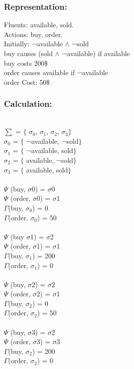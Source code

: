 \documentclass[11pt]{article}
\begin{document}
	\subsubsection{Representation:}\label{par:p202}
	\indent 
	Fluents: available, sold.\\
	Actions: buy, order.\\
	Initially: ¬available $\wedge$  ¬sold\\
	buy causes (sold $\land$ ¬available) if available\\
	buy costs 200$\$$ \\
	order causes available if ¬available\\
	order Cost: 50$\$$ \\
	
	\subsubsection{Calculation:}\label{par:p302}
	\indent \\
	$ \sum $ = $ \{ $ $ \sigma _{0}$, $ \sigma _{1}$, $ \sigma _{2}$, $ \sigma _{3}$$ \} $ \\
	$ \sigma _{0}$ = $ \{ $ ¬available, ¬sold$ \} $ \\
	$ \sigma _{1}$ = $ \{ $ ¬available, sold$ \} $ \\
	$ \sigma _{2}$ = $ \{ $ available, ¬sold$ \} $ \\
	$ \sigma _{3}$ = $ \{ $ available, sold$ \} $ \\
	\\
	\(  \Psi  \)  (buy, $ \sigma $0) = $ \sigma $0\\
	\(  \Psi  \)  (order, $ \sigma $0) = $ \sigma $1\\
	\(\Gamma\)(buy, $\sigma_{0}$) = 0\\
	\(\Gamma\)(order, $\sigma_{0}$) = 50\\
	\\
	\(  \Psi  \)  (buy $ \sigma $1) = $ \sigma $2\\
	\(  \Psi  \)  (order, $ \sigma $1) = $ \sigma $1\\
	\(\Gamma\)(buy, $\sigma_{1}$) = 200\\
	\(\Gamma\)(order, $\sigma_{1}$) = 0\\
	\\
	\(  \Psi  \)  (buy, $ \sigma $2) = $ \sigma $2\\
	\(  \Psi  \)  (order, $ \sigma $2) = $ \sigma $1\\
	\(\Gamma\)(buy, $\sigma_{2}$) = 0\\
	\(\Gamma\)(order, $\sigma_{2}$) = 50\\
	\\
	\(  \Psi  \)  (buy, $ \sigma $3) = $ \sigma $2\\
	\(  \Psi  \)  (order, $ \sigma $3) = $ \sigma $3\\
	\(\Gamma\)(buy, $\sigma_{2}$) = 200\\
	\(\Gamma\)(order, $\sigma_{2}$) = 0\\
\end{document}
